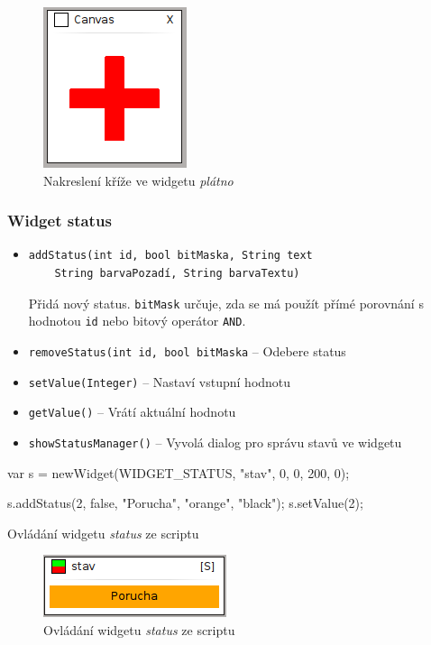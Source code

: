 \documentclass[12pt, a4paper, oneside]{article}
\newcommand{\It}{\textit}  %
\begin{document}
\begin{figure}[H]
\begin{center}
\includegraphics[scale=1]{img/w_canvas.png}
\caption{Nakreslení kříže ve widgetu \It{plátno}}
\end{center}
\end{figure}

\subsubsection*{Widget status}
\begin{itemize}
    \item {\color{blue}
    \begin{verbatim}addStatus(int id, bool bitMaska, String text
    String barvaPozadí, String barvaTextu)
    \end{verbatim}} Přidá nový status. \verb|bitMask| určuje, zda se má použít přímé porovnání s hodnotou \verb|id| nebo bitový operátor \verb|AND|.
    \item {\color{blue}\verb/removeStatus(int id, bool bitMaska/} -- Odebere status
    \item {\color{blue}\verb/setValue(Integer)/} -- Nastaví vstupní hodnotu
    \item {\color{blue}\verb/getValue()/} -- Vrátí aktuální hodnotu
    \item {\color{blue}\verb/showStatusManager()/} -- Vyvolá dialog pro správu stavů ve widgetu
\end{itemize}

\begin{listing}[H]
\begin{jscode}
var s = newWidget(WIDGET_STATUS, "stav", 0, 0, 200, 0);

s.addStatus(2, false, "Porucha", "orange", "black");
s.setValue(2);
\end{jscode}
\caption{Ovládání widgetu \It{status} ze scriptu}
\end{listing}

\begin{figure}[H]
\begin{center}
\includegraphics[scale=1]{img/status_script.png}
\caption{Ovládání widgetu \It{status} ze scriptu}
\end{center}
\end{figure}
\end{document}
